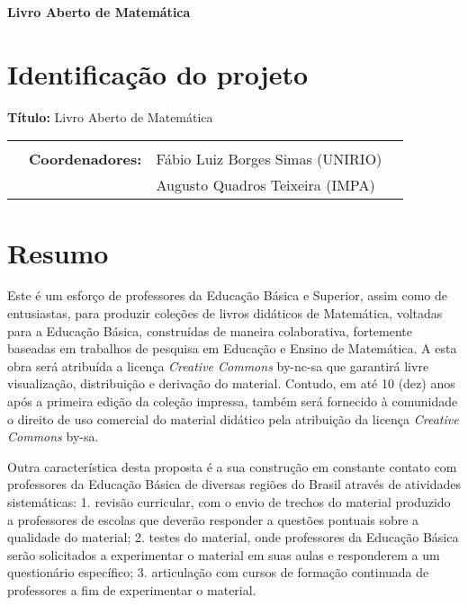 \documentclass[10 pt]{article}
\begin{document}

\begin{center}
{\Large{\bf   Livro Aberto de Matemática}}
 \end{center}


    \section{Identificação do projeto}
\textbf{T\'itulo:} Livro Aberto de Matemática

\begin{flushright}
  \noindent
  \begin{tabular}{llll}
    &&\\
    &\textbf{Coordenadores:}& Fábio Luiz Borges Simas (UNIRIO)\\
    & & Augusto Quadros Teixeira (IMPA)

  \end{tabular}

\end{flushright}
\vspace{0.3cm}

\section{Resumo}



Este é um esforço de professores da Educação Básica e Superior, assim como de entusiastas, para produzir coleções de livros didáticos de Matemática, voltadas para a Educação Básica, construídas de maneira colaborativa, fortemente baseadas em trabalhos de pesquisa em Educação e Ensino de Matemática.
A esta obra será atribuída a licença {\it Creative Commons} by-nc-sa que garantirá livre visualização, distribuição e derivação do material. 
Contudo, em até 10 (dez) anos após a primeira edição da coleção impressa, também será fornecido à comunidade o direito de uso comercial do material didático pela atribuição da licença {\it Creative Commons} by-sa.

Outra característica desta proposta é a sua construção em constante contato com professores da Educação Básica de diversas regiões do Brasil através de atividades sistemáticas: 
1. revisão curricular, com o envio de trechos do material produzido a professores de escolas que deverão responder a questões pontuais sobre a qualidade do material; 
2. testes do material, onde professores da Educação Básica serão solicitados a experimentar o material em suas aulas e responderem a um questionário específico; 
3. articulação com cursos de formação continuada de professores a fim de experimentar o material.
\end{document}

